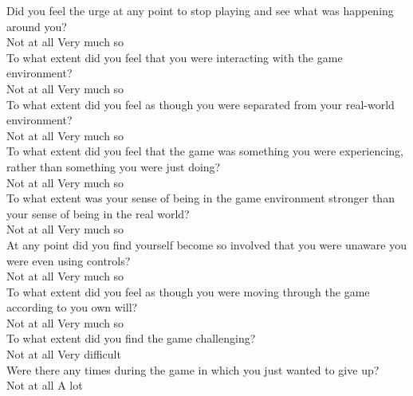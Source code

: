 \documentclass[../II2202-proposal.tex]{subfiles}
\begin{document}
Did you feel the urge at any point to stop playing and see what was happening around you? \\
Not at all      \quad Very much so
\vspace{2mm} \\
To what extent did you feel that you were interacting with the game environment? \\
Not at all      \quad Very much so
\vspace{2mm} \\
To what extent did you feel as though you were separated from your real-world environment? \\
Not at all      \quad Very much so
\vspace{2mm} \\
To what extent did you feel that the game was something you were experiencing, rather than something you were just doing? \\
Not at all      \quad Very much so
\vspace{2mm} \\
To what extent was your sense of being in the game environment stronger than your sense of being in the real world? \\
Not at all      \quad Very much so
\vspace{2mm} \\
At any point did you find yourself become so involved that you were unaware you were even using controls? \\
Not at all      \quad Very much so
\vspace{2mm} \\
To what extent did you feel as though you were moving through the game according to you own will? \\
Not at all      \quad Very much so
\vspace{2mm} \\
To what extent did you find the game challenging?  \\
Not at all      \quad Very difficult
\vspace{2mm} \\
Were there any times during the game in which you just wanted to give up? \\
Not at all      \quad A lot
\end{document}
